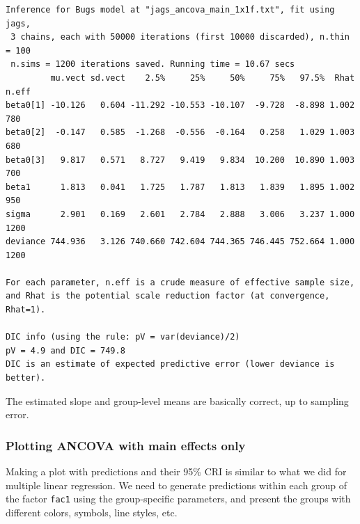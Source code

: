 \documentclass[
  13,
  letterpaper,
]{report}
\begin{document}
\begin{verbatim}
Inference for Bugs model at "jags_ancova_main_1x1f.txt", fit using jags,
 3 chains, each with 50000 iterations (first 10000 discarded), n.thin = 100
 n.sims = 1200 iterations saved. Running time = 10.67 secs
         mu.vect sd.vect    2.5%     25%     50%     75%   97.5%  Rhat n.eff
beta0[1] -10.126   0.604 -11.292 -10.553 -10.107  -9.728  -8.898 1.002   780
beta0[2]  -0.147   0.585  -1.268  -0.556  -0.164   0.258   1.029 1.003   680
beta0[3]   9.817   0.571   8.727   9.419   9.834  10.200  10.890 1.003   700
beta1      1.813   0.041   1.725   1.787   1.813   1.839   1.895 1.002   950
sigma      2.901   0.169   2.601   2.784   2.888   3.006   3.237 1.000  1200
deviance 744.936   3.126 740.660 742.604 744.365 746.445 752.664 1.000  1200

For each parameter, n.eff is a crude measure of effective sample size,
and Rhat is the potential scale reduction factor (at convergence, Rhat=1).

DIC info (using the rule: pV = var(deviance)/2)
pV = 4.9 and DIC = 749.8
DIC is an estimate of expected predictive error (lower deviance is better).
\end{verbatim}

The estimated slope and group-level means are basically correct, up to
sampling error.

\subsubsection{Plotting ANCOVA with main effects
only}\label{plotting-ancova-with-main-effects-only}

Making a plot with predictions and their 95\% CRI is similar to what we
did for multiple linear regression. We need to generate predictions
within each group of the factor \texttt{fac1} using the group-specific
parameters, and present the groups with different colors, symbols, line
styles, etc.
\end{document}
